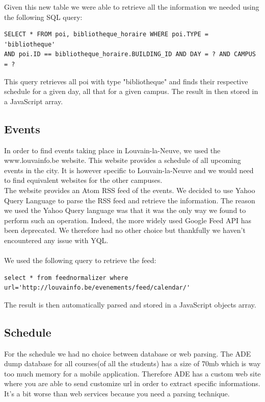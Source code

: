 \documentclass{eplmastersthesis}
\begin{document}
Given this new table we were able to retrieve all the information we needed using the following SQL query:
\begin{verbatim}
SELECT * FROM poi, bibliotheque_horaire WHERE poi.TYPE = 'bibliotheque' 
AND poi.ID == bibliotheque_horaire.BUILDING_ID AND DAY = ? AND CAMPUS = ?
\end{verbatim}

This query retrieves all poi with type "bibliotheque" and finds their respective schedule for a given day, all that for a given campus. The result in then stored in a JavaScript array.

\subsection{Events}

In order to find events taking place in Louvain-la-Neuve, we used the www.louvainfo.be website. This website provides a schedule of all upcoming events in the city. It is however specific to Louvain-la-Neuve and we would need to find equivalent websites for the other campuses. \\ The website provides an Atom RSS feed of the events. We decided to use Yahoo Query Language to parse the RSS feed and retrieve the information. The reason we used the Yahoo Query language was that it was the only way we found to perform such an operation. Indeed, the more widely used Google Feed API has been deprecated. We therefore had no other choice but thankfully we haven't encountered any issue with YQL.\\
\\We used the following query to retrieve the feed:
\begin{verbatim}
select * from feednormalizer where url='http://louvainfo.be/evenements/feed/calendar/'
\end{verbatim}
The result is then automatically parsed and stored in a JavaScript objects array. 

\subsection{Schedule}
For the schedule we had no choice between database or web parsing. The ADE dump database for all courses(of all the students) has a size of 70mb which is way too much memory for a mobile application. Therefore ADE has a custom web site where you are able to send customize url in order to extract specific informations. It's a bit worse than web services because you need a parsing technique.
\end{document}
